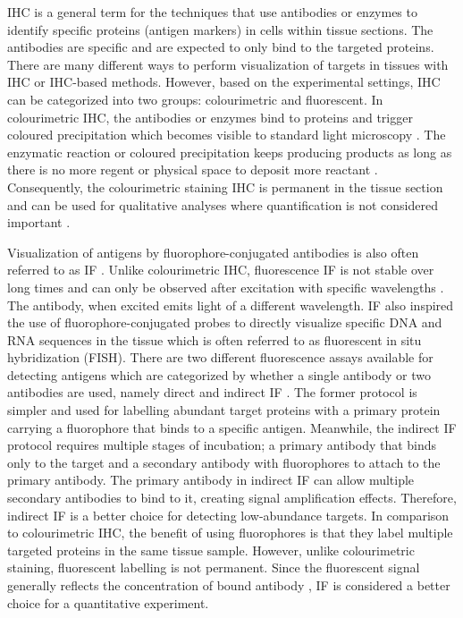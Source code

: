 IHC is a general term for the techniques that use antibodies or enzymes to identify specific proteins (antigen markers) in cells within tissue sections. The antibodies are specific and are expected to only bind to the targeted proteins. There are many different ways to perform visualization of targets in tissues with IHC or IHC-based methods. However, based on the experimental settings, IHC can be categorized into two groups: colourimetric and fluorescent. In colourimetric IHC, the antibodies or enzymes bind to proteins and trigger coloured precipitation which becomes visible to standard light microscopy \cite{BOURGEOIS2014132}. The enzymatic reaction or coloured precipitation keeps producing products as long as there is no more regent or physical space to deposit more reactant \cite{corthell2014basic}. Consequently, the colourimetric staining IHC is permanent in the tissue section and can be used for qualitative analyses where quantification is not considered important \cite{seidal2001interpretation}. 

Visualization of antigens by fluorophore-conjugated antibodies is also often referred to as IF \cite{joshi2017immunofluorescence}. Unlike colourimetric IHC, fluorescence IF is not stable over long times and can only be observed after excitation with specific wavelengths \cite{corthell2014basic}. The antibody, when excited emits light of a different wavelength. IF also inspired the use of fluorophore-conjugated probes to directly visualize specific DNA and RNA sequences in the tissue which is often referred to as fluorescent in situ hybridization (FISH). There are two different fluorescence assays available for detecting antigens which are categorized by whether a single antibody or two antibodies are used, namely direct and indirect IF \cite{JOSHI2017135}. The former protocol is simpler and used for labelling abundant target proteins with a primary protein carrying a fluorophore that binds to a specific antigen. Meanwhile, the indirect IF protocol requires multiple stages of incubation; a primary antibody that binds only to the target and a secondary antibody with fluorophores to attach to the primary antibody. The primary antibody in indirect IF can allow multiple secondary antibodies to bind to it, creating signal amplification effects. Therefore, indirect IF is a better choice for detecting low-abundance targets. In comparison to colourimetric IHC, the benefit of using fluorophores is that they label multiple targeted proteins in the same tissue sample. However, unlike colourimetric staining, fluorescent labelling is not permanent. Since the fluorescent signal generally reflects the concentration of bound antibody \cite{dabbs2017diagnostic}, IF is considered a better choice for a quantitative experiment.

